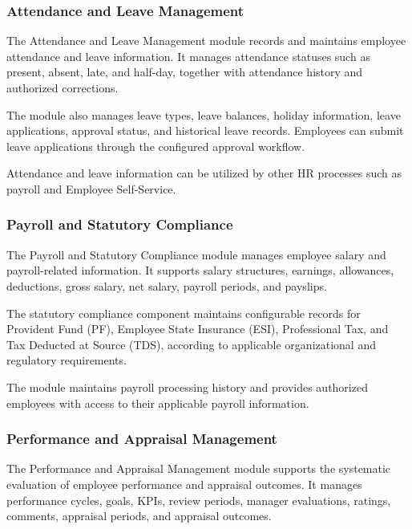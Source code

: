 \documentclass[12pt,a4paper]{article}
\begin{document}
\subsubsection{Attendance and Leave Management}

The Attendance and Leave Management module records and maintains
employee attendance and leave information. It manages attendance
statuses such as present, absent, late, and half-day, together with
attendance history and authorized corrections.

The module also manages leave types, leave balances, holiday
information, leave applications, approval status, and historical
leave records. Employees can submit leave applications through the
configured approval workflow.

Attendance and leave information can be utilized by other HR
processes such as payroll and Employee Self-Service.

\subsubsection{Payroll and Statutory Compliance}

The Payroll and Statutory Compliance module manages employee salary
and payroll-related information. It supports salary structures,
earnings, allowances, deductions, gross salary, net salary, payroll
periods, and payslips.

The statutory compliance component maintains configurable records
for Provident Fund (PF), Employee State Insurance (ESI),
Professional Tax, and Tax Deducted at Source (TDS), according to
applicable organizational and regulatory requirements.

The module maintains payroll processing history and provides
authorized employees with access to their applicable payroll
information.

\subsubsection{Performance and Appraisal Management}

The Performance and Appraisal Management module supports the
systematic evaluation of employee performance and appraisal
outcomes. It manages performance cycles, goals, KPIs, review
periods, manager evaluations, ratings, comments, appraisal
periods, and appraisal outcomes.
\end{document}
